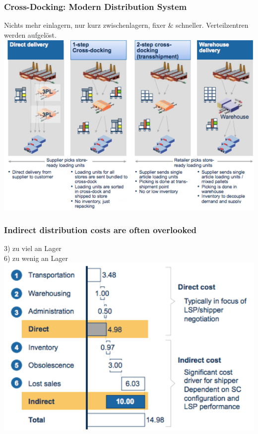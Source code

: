 \subsubsection{Cross-Docking: Modern Distribution System}
Nichts mehr einlagern, nur kurz zwischenlagern, fixer \& schneller. Verteilzentren werden aufgel\"ost.\\
\includegraphics[width=1\textwidth]{W06/crossdocking}
\subsubsection{Indirect distribution costs are often overlooked}
3) zu viel an Lager\\
6) zu wenig an Lager\\
\includegraphics[width=1\textwidth]{W06/indirectcosts}